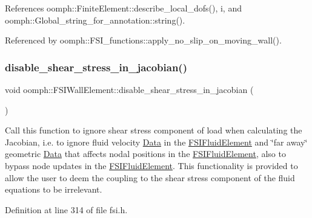 References oomph\+::\+Finite\+Element\+::describe\+\_\+local\+\_\+dofs(), i, and oomph\+::\+Global\+\_\+string\+\_\+for\+\_\+annotation\+::string().



Referenced by oomph\+::\+F\+S\+I\+\_\+functions\+::apply\+\_\+no\+\_\+slip\+\_\+on\+\_\+moving\+\_\+wall().

\mbox{\label{classoomph_1_1FSIWallElement_a5ccc42f1898bba6c5d04ec284db9fd17}} 
\subsubsection{\texorpdfstring{disable\+\_\+shear\+\_\+stress\+\_\+in\+\_\+jacobian()}{disable\_shear\_stress\_in\_jacobian()}}
{\footnotesize\ttfamily void oomph\+::\+F\+S\+I\+Wall\+Element\+::disable\+\_\+shear\+\_\+stress\+\_\+in\+\_\+jacobian (\begin{DoxyParamCaption}{ }\end{DoxyParamCaption})\hspace{0.3cm}{\ttfamily [inline]}}



Call this function to ignore shear stress component of load when calculating the Jacobian, i.\+e. to ignore fluid velocity \hyperlink{classoomph_1_1Data}{Data} in the \hyperlink{classoomph_1_1FSIFluidElement}{F\+S\+I\+Fluid\+Element} and \char`\"{}far away\char`\"{} geometric \hyperlink{classoomph_1_1Data}{Data} that affects nodal positions in the \hyperlink{classoomph_1_1FSIFluidElement}{F\+S\+I\+Fluid\+Element}, also to bypass node updates in the \hyperlink{classoomph_1_1FSIFluidElement}{F\+S\+I\+Fluid\+Element}. This functionality is provided to allow the user to deem the coupling to the shear stress component of the fluid equations to be irrelevant. 



Definition at line 314 of file fsi.\+h.

\mbox{\label{classoomph_1_1FSIWallElement_a0dc3efdeb5d0abf0ba473c0145652358}} 
